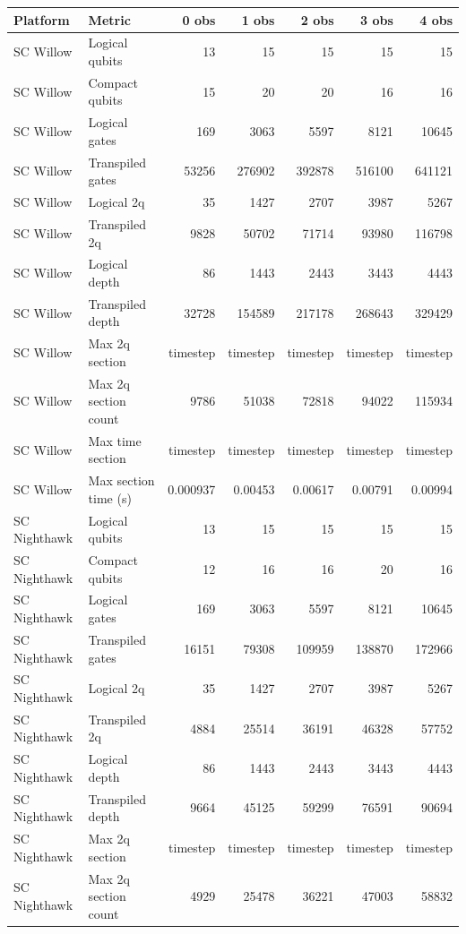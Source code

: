 \begin{table}
\centering
\scriptsize
\begin{tabular}{llrrrrr}
\hline
Platform & Metric & 0 obs & 1 obs & 2 obs & 3 obs & 4 obs \\
\hline
SC Willow & Logical qubits & 13 & 15 & 15 & 15 & 15 \\
SC Willow & Compact qubits & 15 & 20 & 20 & 16 & 16 \\
SC Willow & Logical gates & 169 & 3063 & 5597 & 8121 & 10645 \\
SC Willow & Transpiled gates & 53256 & 276902 & 392878 & 516100 & 641121 \\
SC Willow & Logical 2q & 35 & 1427 & 2707 & 3987 & 5267 \\
SC Willow & Transpiled 2q & 9828 & 50702 & 71714 & 93980 & 116798 \\
SC Willow & Logical depth & 86 & 1443 & 2443 & 3443 & 4443 \\
SC Willow & Transpiled depth & 32728 & 154589 & 217178 & 268643 & 329429 \\
SC Willow & Max 2q section & timestep & timestep & timestep & timestep & timestep \\
SC Willow & Max 2q section count & 9786 & 51038 & 72818 & 94022 & 115934 \\
SC Willow & Max time section & timestep & timestep & timestep & timestep & timestep \\
SC Willow & Max section time (s) & 0.000937 & 0.00453 & 0.00617 & 0.00791 & 0.00994 \\
\hline
SC Nighthawk & Logical qubits & 13 & 15 & 15 & 15 & 15 \\
SC Nighthawk & Compact qubits & 12 & 16 & 16 & 20 & 16 \\
SC Nighthawk & Logical gates & 169 & 3063 & 5597 & 8121 & 10645 \\
SC Nighthawk & Transpiled gates & 16151 & 79308 & 109959 & 138870 & 172966 \\
SC Nighthawk & Logical 2q & 35 & 1427 & 2707 & 3987 & 5267 \\
SC Nighthawk & Transpiled 2q & 4884 & 25514 & 36191 & 46328 & 57752 \\
SC Nighthawk & Logical depth & 86 & 1443 & 2443 & 3443 & 4443 \\
SC Nighthawk & Transpiled depth & 9664 & 45125 & 59299 & 76591 & 90694 \\
SC Nighthawk & Max 2q section & timestep & timestep & timestep & timestep & timestep \\
SC Nighthawk & Max 2q section count & 4929 & 25478 & 36221 & 47003 & 58832 \\

\end{tabular}
\end{table}
